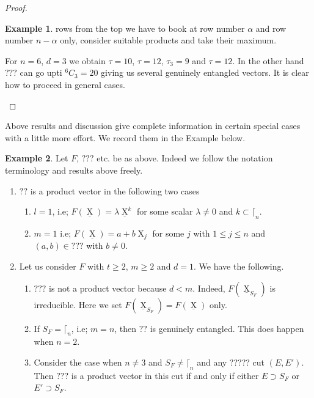 \documentclass[a4paper,12pt]{article}
\DeclareMathOperator{\x}{\mathrm{X}}
\theoremstyle{definition}
\theoremstyle{underlinethm}
\newtheorem{example}{Example}[section]
\theoremstyle{underline}
\begin{document}
\begin{proof}
\begin{example}
rows from the top we have to book at row number $\alpha$ and row number $n-\alpha$ only, consider suitable products and take their maximum.

For $n=6$, $d=3$ we obtain $\tau = 10$, $\tau = 12$, $\tau_{3} = 9$ and $\tau = 12$. In the other hand $???$ can go upti $^6C_{3} = 20$ giving us several genuinely entangled vectors. It is clear how to proceed in general cases.
\end{example}
\end{proof}

Above results and discussion give complete information in certain special cases with a little more effort. We record them in the Example below.

\begin{example}\label{example-2.2}
 Let $F$, $???$ etc. be as above. Indeed we follow the notation terminology and results above freely. 
 
 \begin{enumerate}[label=(\roman*)]
 \item $??$ is a product vector in the following two cases
 
   \begin{enumerate}[label=(\alph*)]
   \item $l=1$, i.e; $F(\underline{\x}) = \lambda\underline{\x}^{k}$ for some scalar $\lambda \neq 0$ and $k \subset \lceil_{n}$.
	\item $m=1$ i.e; $F(\underline{\x}) = a + b\x_{j}$ for some $j$ with $1 \leq j \leq n$ and $(a , b) \in ???$ with $b \neq 0$.
   \end{enumerate}
   
 \item Let us consider $F$ with $t \geq 2$, $m \geq 2$ and $d =1$. We have the following.
 
 \begin{enumerate}[label=(\alph*)]
 \item $???$ is not a product vector because $d < m$. Indeed, $F(\underline{\x}_{S_{F}})$ is irreducible. Here we set $F(\underline{\x}_{S_{F}}) = F(\underline{\x})$ only.
 \item If $S_{F} = \lceil_{n}$, i.e; $m=n$, then $??$ is genuinely entangled. This does happen when $n=2$.
 \item Consider the case when $n \neq 3$ and $S_{F} \neq \lceil_{n}$ and any ????? cut $(E, E')$. Then $???$ is a product vector in this cut if and only if either $E \supset S_{F}$ or $E' \supset S_{F}$.
  \end{enumerate}
 

\end{enumerate}
\end{example}
\end{document}
